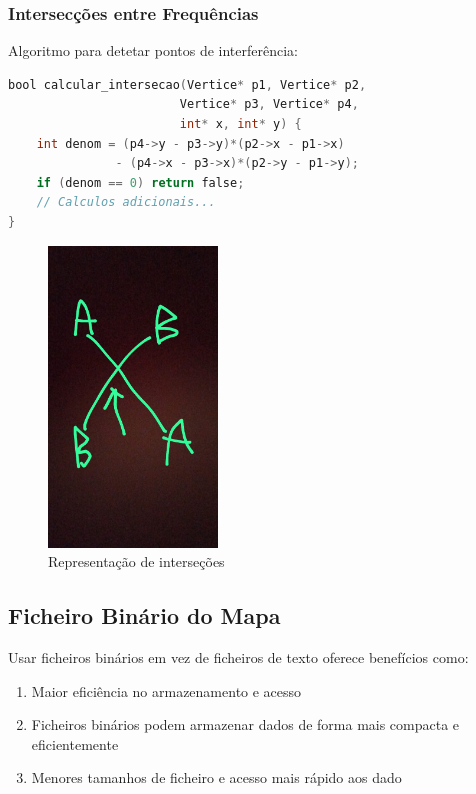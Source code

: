 \documentclass[a4paper,12pt]{report}
\begin{document}
\subsubsection{Intersecções entre Frequências}
Algoritmo para detetar pontos de interferência:

\begin{lstlisting}[language=C]
bool calcular_intersecao(Vertice* p1, Vertice* p2, 
                        Vertice* p3, Vertice* p4, 
                        int* x, int* y) {
    int denom = (p4->y - p3->y)*(p2->x - p1->x) 
               - (p4->x - p3->x)*(p2->y - p1->y);
    if (denom == 0) return false;
    // Calculos adicionais...
}
\end{lstlisting}

\begin{figure}[H]
\centering
\includegraphics[width=0.4\textwidth]{intersecoes.png}
\caption{Representação de interseções}
\label{fig:grafo}
\end{figure}

\subsection{Ficheiro Binário do Mapa}

Usar ficheiros binários em vez de ficheiros de texto oferece benefícios como:

\begin{enumerate}
    \item Maior eficiência no armazenamento e acesso
    \item Ficheiros binários podem armazenar dados de forma mais compacta e eficientemente
    \item Menores tamanhos de ficheiro e acesso mais rápido aos dado
\end{enumerate}
\end{document}
